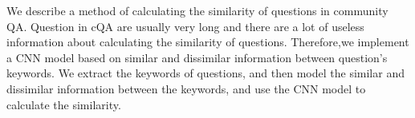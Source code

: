 We describe a method of calculating the similarity of questions in community QA. Question in cQA are usually very long and there are a lot of useless information about calculating the similarity of questions. Therefore,we implement a CNN model based on similar and dissimilar information between question's keywords. We extract the keywords of questions, and then model the similar and dissimilar information between the keywords, and use the CNN model to calculate the similarity.
